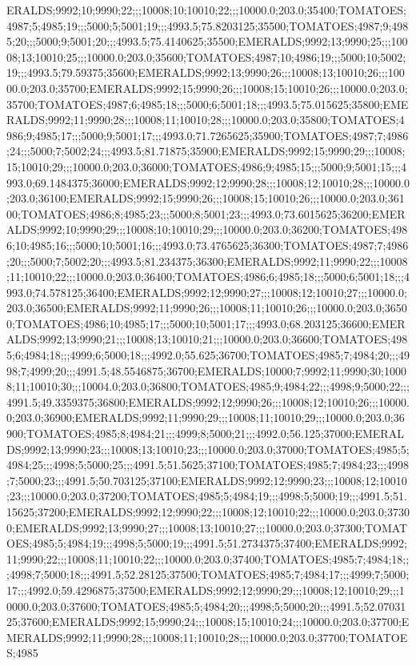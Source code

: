 ERALDS;9992;10;9990;22;;;10008;10;10010;22;;;10000.0;203.0;35400;TOMATOES;4987;5;4985;19;;;5000;5;5001;19;;;4993.5;75.8203125;35500;TOMATOES;4987;9;4985;20;;;5000;9;5001;20;;;4993.5;75.4140625;35500;EMERALDS;9992;13;9990;25;;;10008;13;10010;25;;;10000.0;203.0;35600;TOMATOES;4987;10;4986;19;;;5000;10;5002;19;;;4993.5;79.59375;35600;EMERALDS;9992;13;9990;26;;;10008;13;10010;26;;;10000.0;203.0;35700;EMERALDS;9992;15;9990;26;;;10008;15;10010;26;;;10000.0;203.0;35700;TOMATOES;4987;6;4985;18;;;5000;6;5001;18;;;4993.5;75.015625;35800;EMERALDS;9992;11;9990;28;;;10008;11;10010;28;;;10000.0;203.0;35800;TOMATOES;4986;9;4985;17;;;5000;9;5001;17;;;4993.0;71.7265625;35900;TOMATOES;4987;7;4986;24;;;5000;7;5002;24;;;4993.5;81.71875;35900;EMERALDS;9992;15;9990;29;;;10008;15;10010;29;;;10000.0;203.0;36000;TOMATOES;4986;9;4985;15;;;5000;9;5001;15;;;4993.0;69.1484375;36000;EMERALDS;9992;12;9990;28;;;10008;12;10010;28;;;10000.0;203.0;36100;EMERALDS;9992;15;9990;26;;;10008;15;10010;26;;;10000.0;203.0;36100;TOMATOES;4986;8;4985;23;;;5000;8;5001;23;;;4993.0;73.6015625;36200;EMERALDS;9992;10;9990;29;;;10008;10;10010;29;;;10000.0;203.0;36200;TOMATOES;4986;10;4985;16;;;5000;10;5001;16;;;4993.0;73.4765625;36300;TOMATOES;4987;7;4986;20;;;5000;7;5002;20;;;4993.5;81.234375;36300;EMERALDS;9992;11;9990;22;;;10008;11;10010;22;;;10000.0;203.0;36400;TOMATOES;4986;6;4985;18;;;5000;6;5001;18;;;4993.0;74.578125;36400;EMERALDS;9992;12;9990;27;;;10008;12;10010;27;;;10000.0;203.0;36500;EMERALDS;9992;11;9990;26;;;10008;11;10010;26;;;10000.0;203.0;36500;TOMATOES;4986;10;4985;17;;;5000;10;5001;17;;;4993.0;68.203125;36600;EMERALDS;9992;13;9990;21;;;10008;13;10010;21;;;10000.0;203.0;36600;TOMATOES;4985;6;4984;18;;;4999;6;5000;18;;;4992.0;55.625;36700;TOMATOES;4985;7;4984;20;;;4998;7;4999;20;;;4991.5;48.5546875;36700;EMERALDS;10000;7;9992;11;9990;30;10008;11;10010;30;;;10004.0;203.0;36800;TOMATOES;4985;9;4984;22;;;4998;9;5000;22;;;4991.5;49.3359375;36800;EMERALDS;9992;12;9990;26;;;10008;12;10010;26;;;10000.0;203.0;36900;EMERALDS;9992;11;9990;29;;;10008;11;10010;29;;;10000.0;203.0;36900;TOMATOES;4985;8;4984;21;;;4999;8;5000;21;;;4992.0;56.125;37000;EMERALDS;9992;13;9990;23;;;10008;13;10010;23;;;10000.0;203.0;37000;TOMATOES;4985;5;4984;25;;;4998;5;5000;25;;;4991.5;51.5625;37100;TOMATOES;4985;7;4984;23;;;4998;7;5000;23;;;4991.5;50.703125;37100;EMERALDS;9992;12;9990;23;;;10008;12;10010;23;;;10000.0;203.0;37200;TOMATOES;4985;5;4984;19;;;4998;5;5000;19;;;4991.5;51.15625;37200;EMERALDS;9992;12;9990;22;;;10008;12;10010;22;;;10000.0;203.0;37300;EMERALDS;9992;13;9990;27;;;10008;13;10010;27;;;10000.0;203.0;37300;TOMATOES;4985;5;4984;19;;;4998;5;5000;19;;;4991.5;51.2734375;37400;EMERALDS;9992;11;9990;22;;;10008;11;10010;22;;;10000.0;203.0;37400;TOMATOES;4985;7;4984;18;;;4998;7;5000;18;;;4991.5;52.28125;37500;TOMATOES;4985;7;4984;17;;;4999;7;5000;17;;;4992.0;59.4296875;37500;EMERALDS;9992;12;9990;29;;;10008;12;10010;29;;;10000.0;203.0;37600;TOMATOES;4985;5;4984;20;;;4998;5;5000;20;;;4991.5;52.0703125;37600;EMERALDS;9992;15;9990;24;;;10008;15;10010;24;;;10000.0;203.0;37700;EMERALDS;9992;11;9990;28;;;10008;11;10010;28;;;10000.0;203.0;37700;TOMATOES;4985